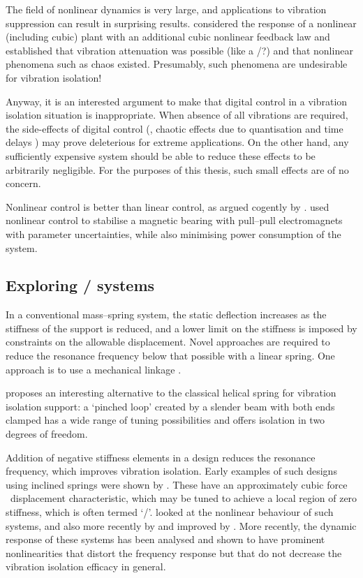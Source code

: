 The field of nonlinear dynamics is very large, and applications to vibration suppression can result in surprising results.
\textcite{oueini1999} considered the response of a nonlinear (including cubic) plant with an additional cubic nonlinear feedback law and established that vibration attenuation was possible (like a \vibneut/?) and that nonlinear phenomena such as chaos existed.
Presumably, such phenomena are undesirable for vibration isolation!

Anyway, it is an interested argument to make that digital control in a vibration isolation situation is inappropriate.
When absence of all vibrations are required, the side-effects of digital control (\ie, chaotic effects due to quantisation and time delays \cite{csernak2007}) may prove deleterious for extreme applications.
On the other hand, any sufficiently expensive system should be able to reduce these effects to be arbitrarily negligible.
For the purposes of this thesis, such small effects are of no concern.

Nonlinear control is better than linear control, as argued cogently by \textcite{kokotovic1992}.
\textcite{queiroz2007} used nonlinear control to stabilise a magnetic bearing with pull--pull electromagnets with parameter uncertainties, while also minimising power consumption of the system.


\subsection{Exploring \qzs/ systems}

In a conventional mass--spring system, the static deflection increases as the stiffness of the support is reduced, and a lower limit on the stiffness is imposed by constraints on the allowable displacement.
Novel approaches are required to reduce the resonance frequency below that possible with a linear spring.
One approach is to use a mechanical linkage \cite{winterflood2001}.

\textcite{virgin2008} proposes an interesting alternative to the classical helical spring for vibration isolation support: a `pinched loop' created by a slender beam with both ends clamped has a wide range of tuning possibilities and offers isolation in two degrees of freedom.

Addition of negative stiffness elements in a design reduces the resonance frequency, which improves vibration isolation.
Early examples of such designs using inclined springs were shown by \textcite{molyneux1957}.
These have an approximately cubic force \vs\ displacement characteristic, which may be tuned to achieve a local region of zero stiffness, which is often termed `\qzs/'.
\textcite{alabuzhev1989} looked at the nonlinear behaviour of such
systems, and also more recently by
\textcite{carrella2006,carrella2007-jsv,carrella2008-jsv,carrella2009} and improved by
\textcite{kovacic2008}.
More recently, the dynamic response of these systems has been analysed \parencite{carrella2009,carrella2008-thesis} and shown to have prominent nonlinearities that distort the frequency response but that do not decrease the vibration isolation efficacy in general.

